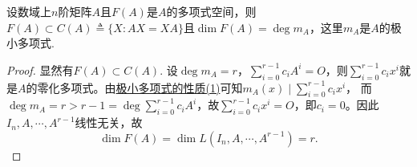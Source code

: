 \documentclass[../../main.tex]{subfiles}
\begin{document}
\begin{proposition}\label{proposition:矩阵多项式空间的维数等于极小多项式的次数}
设数域上$n$阶矩阵$A$且$F(A)$是$A$的多项式空间，则$F(A)\subset C(A)\triangleq\{X: AX = XA\}$且$\dim F(A)=\deg m_A$，这里$m_A$是$A$的极小多项式.
\end{proposition}
\begin{proof}
显然有$F(A)\subset C(A)$.
设\(\deg m_A = r\)，\(\sum_{i = 0}^{r - 1} c_i A^i = O\)，则\(\sum_{i = 0}^{r - 1} c_i x^i\)就是\(A\)的零化多项式。由\hyperref[proposition:极小多项式的性质]{极小多项式的性质(1)}可知\(m_A(x) \mid \sum_{i = 0}^{r - 1} c_i x^i\)，  
而\(\deg m_A = r > r - 1 = \deg \sum_{i = 0}^{r - 1} c_i A^i\)，故\(\sum_{i = 0}^{r - 1} c_i x^i = O\)，即\(c_i = 0\)。因此\(I_n, A, \cdots, A^{r - 1}\)线性无关，故  
\[
\dim F(A) = \dim L(I_n, A, \cdots, A^{r - 1}) = r.
\]
\end{proof}
\end{document}
